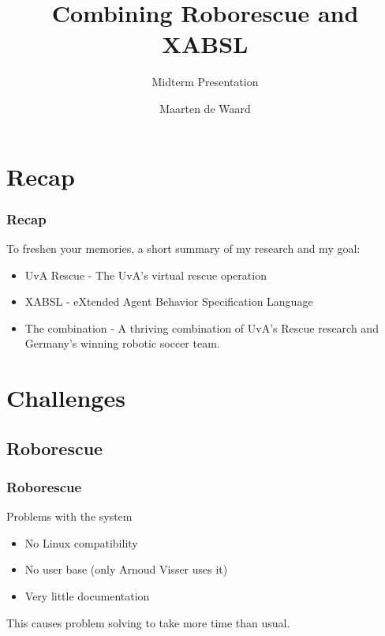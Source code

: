 \documentclass{beamer}
\title{Combining Roborescue and XABSL}
\subtitle{Midterm Presentation}
\author{Maarten de Waard}
\institute{UvA}
\newcommand{\slide}[2]
{
\begin{frame}
\frametitle{#1} 

#2

\end{frame}
}
\begin{document}
{
\begin{frame}
\titlepage
\end{frame}
}

\section{Recap}
\slide{Recap}
{
    To freshen your memories, a short summary of my research and my goal:
    \begin{itemize}
        \item UvA Rescue - The UvA's virtual rescue operation
        \item XABSL - eXtended Agent Behavior Specification Language
        \item The combination - A thriving combination of UvA's Rescue research and Germany's winning robotic soccer team.
    \end{itemize}
}

\section{Challenges}
\subsection{Roborescue}
\slide{Roborescue}
{
    Problems with the system
    \begin{itemize}
        \item No Linux compatibility
        \item No user base (only Arnoud Visser uses it)
        \item Very little documentation
    \end{itemize}
    This causes problem solving to take more time than usual.
}
\end{document}
